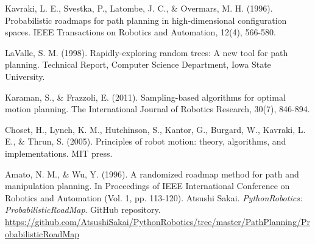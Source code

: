 \documentclass[12pt,a4paper,openany,oneside]{report}
\begin{document}
\begin{thebibliography}{99}
 Kavraki, L. E., Svestka, P., Latombe, J. C., \& Overmars, M. H. (1996). Probabilistic roadmaps for path planning in high-dimensional configuration spaces. IEEE Transactions on Robotics and Automation, 12(4), 566-580.

 LaValle, S. M. (1998). Rapidly-exploring random trees: A new tool for path planning. Technical Report, Computer Science Department, Iowa State University.

 Karaman, S., \& Frazzoli, E. (2011). Sampling-based algorithms for optimal motion planning. The International Journal of Robotics Research, 30(7), 846-894.

 Choset, H., Lynch, K. M., Hutchinson, S., Kantor, G., Burgard, W., Kavraki, L. E., \& Thrun, S. (2005). Principles of robot motion: theory, algorithms, and implementations. MIT press.

 Amato, N. M., \& Wu, Y. (1996). A randomized roadmap method for path and manipulation planning. In Proceedings of IEEE International Conference on Robotics and Automation (Vol. 1, pp. 113-120).
Atsushi Sakai. \emph{PythonRobotics: ProbabilisticRoadMap}. GitHub repository. 
\url{https://github.com/AtsushiSakai/PythonRobotics/tree/master/PathPlanning/ProbabilisticRoadMap}
\end{thebibliography}
\end{document}
